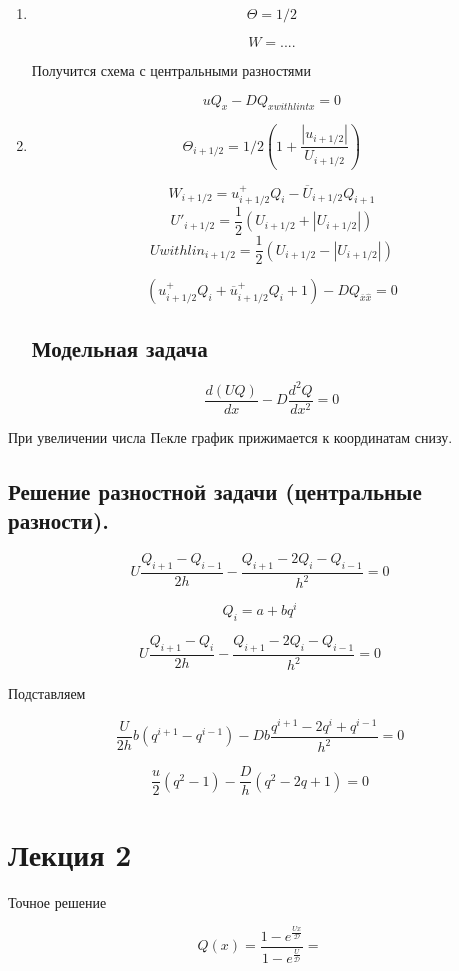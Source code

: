 \documentclass[12pt, a4paper]{article}
\begin{document}
\begin{enumerate}
	\item \[ \Theta = 1/2 \]

	\[ W = .... \]

	Получится схема с центральными разностями

	\[ u Q_x - D Q_{x with lint x} = 0 \]

	\item \[ \Theta_{i+1/2} = 1/2(1+\frac{|u_{i+1/2}|}{U_{i+1/2}}) \]

	\[ W_{i+1/2} = u^+_{i+1/2} Q_i - \overline{U}_{i+1/2} Q_{i+1} \]
	\[ U'_{i+1/2} = \frac{1}{2} (U_{i+1/2} + |U_{i+1/2}|) \]
	\[ U with lin_{i+1/2} = \frac{1}{2} (U_{i+1/2} - |U_{i+1/2}|) \]

	\[ (u^+_{i+1/2} Q_i + \overline{u}^+_{i+1/2} Q_i+1) - D Q_{\overline{x} \widehat{x}} = 0 \]

\subsection{Модельная задача}

	\[ \frac{d(UQ)}{dx} - D \frac{d^2Q}{dx^2} = 0 \]

\end{enumerate}

При увеличении числа Пeкле график прижимается к координатам снизу.

\subsection{Решение разностной задачи (центральные разности).}

\[ U \frac{Q_{i+1} - Q_{i-1}}{2h} - \frac{Q_{i+1} - 2Q_{i} - Q_{i-1}}{h^2} = 0\]

\[ Q_i = a + b q^i \]

\[ U \frac{Q_{i+1} - Q_i}{2h} - \frac{Q_{i+1} - 2Q_{i} - Q_{i-1}}{h^2} = 0\]

Подставляем

\[ \frac{U}{2h} b(q^{i+1} - q^{i-1}) -  D b \frac{q^{i+1}-2q^i+q^{i-1}}{h^2} = 0 \]

\[ \frac{u}{2} (q^2-1) - \frac{D}{h}(q^2-2q+1) = 0 \]

\section{Лекция 2}

Точное решение

\[ Q(x) = \frac{1-e^{\frac{Ux}{\mathcal{D}}}}{1-e^{\frac{U}{\mathcal{D}}}} = \]
\end{document}
